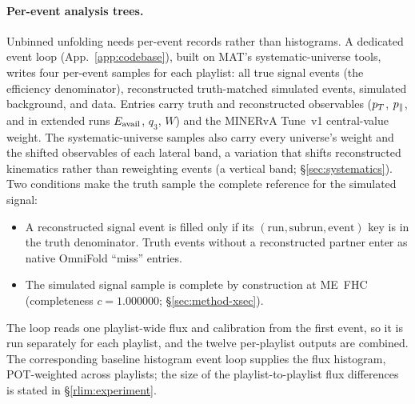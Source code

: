 \paragraph{Per-event analysis trees.} Unbinned unfolding needs per-event records rather than histograms. A dedicated event loop (App.~\ref{app:codebase}), built on MAT's systematic-universe tools, writes four per-event samples for each playlist: all true signal events (the efficiency denominator), reconstructed truth-matched simulated events, simulated background, and data. Entries carry truth and reconstructed observables ($p_{T}$, $p_{\parallel}$, and in extended runs $E_{\mathrm{avail}}$, $q_{3}$, $W$) and the MINERvA Tune~v1 central-value weight. The systematic-universe samples also carry every universe's weight and the shifted observables of each lateral band, a variation that shifts reconstructed kinematics rather than reweighting events (a vertical band; \S\ref{sec:systematics}). Two conditions make the truth sample the complete reference for the simulated signal:
\begin{itemize}
  \item A reconstructed signal event is filled only if its $(\mathrm{run},\mathrm{subrun},\mathrm{event})$ key is in the truth denominator. Truth events without a reconstructed partner enter as native OmniFold ``miss'' entries.
  \item The simulated signal sample is complete by construction at ME~FHC (completeness $c=1.000000$; \S\ref{sec:method-xsec}).
\end{itemize}
The loop reads one playlist-wide flux and calibration from the first event, so it is run separately for each playlist, and the twelve per-playlist outputs are combined. The corresponding baseline histogram event loop supplies the flux histogram, POT-weighted across playlists; the size of the playlist-to-playlist flux differences is stated in \S\ref{rlim:experiment}.

